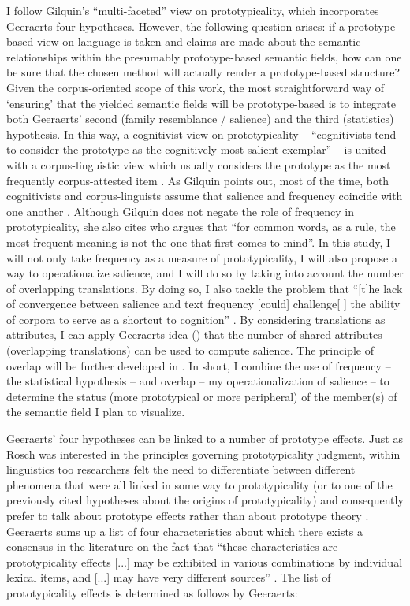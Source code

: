I follow Gilquin’s “multi-faceted” view on prototypicality, which incorporates Geeraerts four hypotheses. However, the following question arises: if a prototype-based view on language is taken and claims are made about the semantic relationships within the presumably prototype-based semantic fields, how can one be sure that the chosen method will actually render a prototype-based structure? Given the corpus-oriented scope of this work, the most straightforward way of ‘ensuring’ that the yielded semantic fields will be prototype-based is to integrate both Geeraerts’ second (family resemblance / salience) and the third (statistics) hypothesis. In this way, a cognitivist view on prototypicality – “cognitivists tend to consider the prototype as the cognitively most salient exemplar” \citep[159]{gilquin_place_2006} – is united with a corpus-linguistic view which usually considers the prototype as the most frequently corpus-attested item \citep{gilquin_place_2006}. As Gilquin points out, most of the time, both cognitivists and corpus-linguists assume that salience and frequency coincide with one another \citep{gilquin_place_2006}. Although Gilquin does not negate the role of frequency in prototypicality, she also cites \citet[36]{sinclair_corpus_1991} who argues that “for common words, as a rule, the most frequent meaning is not the one that first comes to mind”. In this study, I will not only take frequency as a measure of prototypicality, I will also propose a way to operationalize salience, and I will do so by taking into account the number of overlapping translations. By doing so, I also tackle the problem that “[t]he lack of convergence between salience and text frequency [could] challenge[ ] the ability of corpora to serve as a shortcut to cognition” \citep[9]{arppe_cognitive_2010}. By considering translations as attributes, I can apply Geeraerts idea (\citeyear[29]{geeraerts_where_2006}) that the number of shared attributes (overlapping translations) can be used to compute salience. The principle of overlap will be further developed in . In short, I combine the use of frequency – the statistical hypothesis – and overlap – my operationalization of salience – to determine the status (more prototypical or more peripheral) of the member(s) of the semantic field I plan to visualize.

Geeraerts’ four hypotheses can be linked to a number of prototype effects. Just as Rosch was interested in the principles governing prototypicality judgment, within linguistics too researchers felt the need to differentiate between different phenomena that were all linked in some way to prototypicality (or to one of the previously cited hypotheses about the origins of prototypicality) and consequently prefer to talk about prototype effects rather than about prototype theory \citep[578]{allan_lexical_2013}. Geeraerts sums up a list of four characteristics about which there exists a consensus in the literature on the fact that “these characteristics are prototypicality effects [...] may be exhibited in various combinations by individual lexical items, and [...] may have very different sources” \citep[578]{allan_lexical_2013}. The list of prototypicality effects is determined as follows by Geeraerts:

